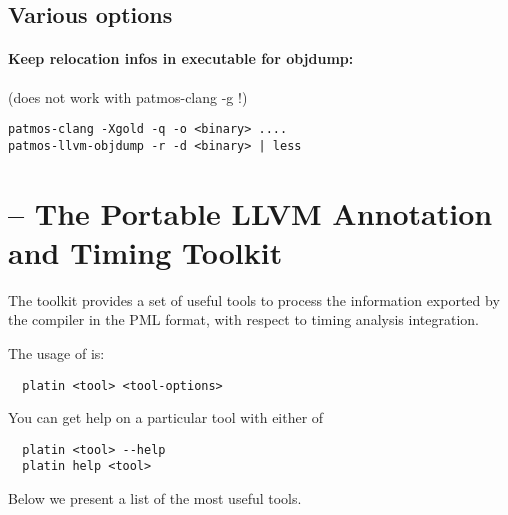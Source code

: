 \subsection{Various options}

\paragraph{Keep relocation infos in executable for objdump:} (does not work with patmos-clang -g !)

\begin{verbatim}
patmos-clang -Xgold -q -o <binary> ....
patmos-llvm-objdump -r -d <binary> | less
\end{verbatim}




\section{ -- The Portable LLVM Annotation and Timing Toolkit}
\label{sec:toolchain:platin}

The  toolkit provides a set of useful tools to process the
information exported by the compiler in the PML format, with respect to
timing analysis integration.


The usage of  is:

\begin{verbatim}
  platin <tool> <tool-options>
\end{verbatim}

You can get help on a particular tool with either of

\begin{verbatim}
  platin <tool> --help
  platin help <tool>
\end{verbatim}


Below we present a list of the most useful tools.


